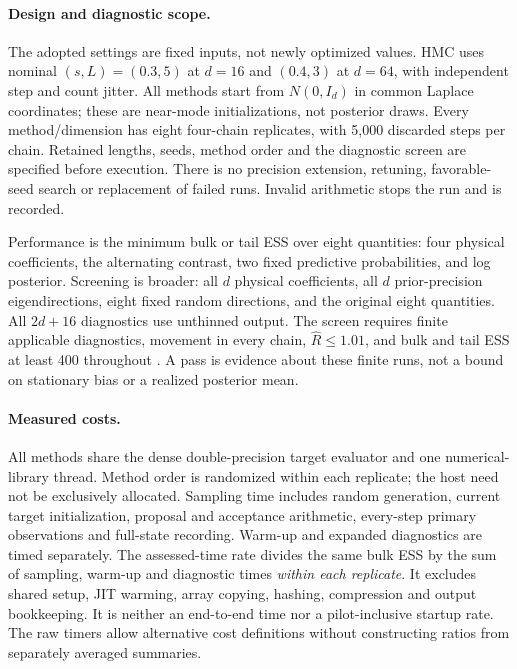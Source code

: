 \documentclass[pdflatex,iicol,sn-mathphys-ay]{sn-jnl}
\theoremstyle{definition}\newtheorem{definition}[theorem]{Definition}
\theoremstyle{remark}\newtheorem{remark}[theorem]{Remark}
\numberwithin{equation}{section}
\newcommand{\1}{\mathbf 1}
\begin{document}
\paragraph{Design and diagnostic scope.}
The adopted settings are fixed inputs, not newly optimized values. HMC uses nominal $(s,L)=(0.3,5)$ at $d=16$ and $(0.4,3)$ at $d=64$, with independent step and count jitter. All methods start from $N(0,I_d)$ in common Laplace coordinates; these are near-mode initializations, not posterior draws. Every method/dimension has eight four-chain replicates, with 5,000 discarded steps per chain. Retained lengths, seeds, method order and the diagnostic screen are specified before execution. There is no precision extension, retuning, favorable-seed search or replacement of failed runs. Invalid arithmetic stops the run and is recorded.

Performance is the minimum bulk or tail ESS over eight quantities: four physical coefficients, the alternating contrast, two fixed predictive probabilities, and log posterior. Screening is broader: all $d$ physical coefficients, all $d$ prior-precision eigendirections, eight fixed random directions, and the original eight quantities. All $2d+16$ diagnostics use unthinned output. The screen requires finite applicable diagnostics, movement in every chain, $\widehat R\le1.01$, and bulk and tail ESS at least 400 throughout \citep{vehtari}. A pass is evidence about these finite runs, not a bound on stationary bias or a realized posterior mean.

\paragraph{Measured costs.}
All methods share the dense double-precision target evaluator and one numerical-library thread. Method order is randomized within each replicate; the host need not be exclusively allocated. Sampling time includes random generation, current target initialization, proposal and acceptance arithmetic, every-step primary observations and full-state recording. Warm-up and expanded diagnostics are timed separately. The assessed-time rate divides the same bulk ESS by the sum of sampling, warm-up and diagnostic times \emph{within each replicate}. It excludes shared setup, JIT warming, array copying, hashing, compression and output bookkeeping. It is neither an end-to-end time nor a pilot-inclusive startup rate. The raw timers allow alternative cost definitions without constructing ratios from separately averaged summaries.
\end{document}
